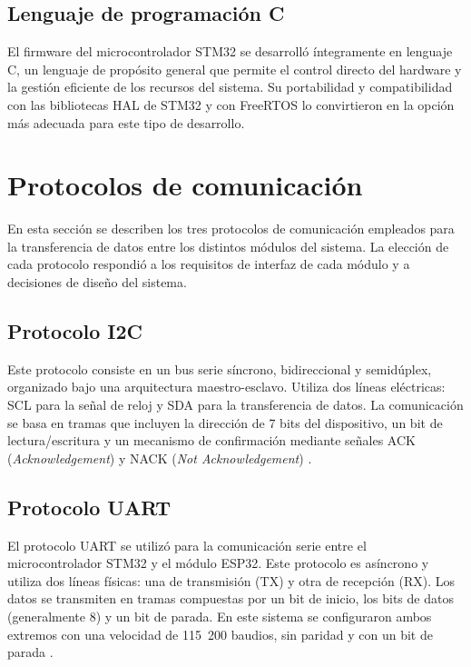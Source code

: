 \subsection{Lenguaje de programación C}

El firmware del microcontrolador STM32 se desarrolló íntegramente en lenguaje C, un lenguaje de propósito general que permite el control directo del hardware y la gestión eficiente de los recursos del sistema. Su portabilidad y compatibilidad con las bibliotecas HAL de STM32 y con FreeRTOS lo convirtieron en la opción más adecuada para este tipo de desarrollo.

\section{Protocolos de comunicación}

En esta sección se describen los tres protocolos de comunicación empleados para la transferencia de datos entre los distintos módulos del sistema. La elección de cada protocolo respondió a los requisitos 
de interfaz de cada módulo y a decisiones de diseño del sistema.

\subsection{Protocolo I2C}

Este protocolo consiste en un bus serie síncrono, bidireccional y semidúplex, organizado bajo una arquitectura maestro-esclavo. Utiliza dos líneas eléctricas: SCL para la señal de reloj y SDA para la transferencia de datos. La comunicación se basa en tramas que incluyen la dirección de 7 bits del dispositivo, un bit de lectura/escritura y un mecanismo de confirmación mediante señales ACK (\textit{Acknowledgement}) y NACK (\textit{Not Acknowledgement}) \cite{i2c_spec}.

\subsection{Protocolo UART}

El protocolo UART se utilizó para la comunicación serie entre el microcontrolador STM32 y el módulo ESP32. Este protocolo es asíncrono y utiliza dos líneas físicas: una de transmisión (TX) y otra de recepción (RX). Los datos se transmiten en tramas compuestas por un bit de inicio, los bits de datos (generalmente 8) y un bit de parada. En este sistema se configuraron ambos extremos con una velocidad de 115~200 baudios, sin paridad y con un bit de parada \cite{uart_spec}.

